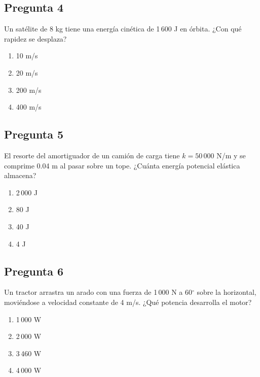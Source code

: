 \begin{preguntabox}
\subsection{Pregunta 4}
Un satélite de 8 kg tiene una energía cinética de 1\,600 J en órbita. ¿Con qué rapidez se desplaza?

\begin{enumerate}
    \item[A)] 10 m/s
    \item[B)] 20 m/s
    \item[C)] 200 m/s
    \item[D)] 400 m/s
\end{enumerate}
\end{preguntabox}

\begin{preguntabox}
\subsection{Pregunta 5}
El resorte del amortiguador de un camión de carga tiene $k = 50\,000$ N/m y se comprime 0.04 m al pasar sobre un tope. ¿Cuánta energía potencial elástica almacena?

\begin{enumerate}
    \item[A)] 2\,000 J
    \item[B)] 80 J
    \item[C)] 40 J
    \item[D)] 4 J
\end{enumerate}
\end{preguntabox}


\begin{preguntabox}
\subsection{Pregunta 6}
Un tractor arrastra un arado con una fuerza de 1\,000 N a 60$^\circ$ sobre la horizontal, moviéndose a velocidad constante de 4 m/s. ¿Qué potencia desarrolla el motor?

\begin{enumerate}
    \item[A)] 1\,000 W
    \item[B)] 2\,000 W
    \item[C)] 3\,460 W
    \item[D)] 4\,000 W
\end{enumerate}
\end{preguntabox}

